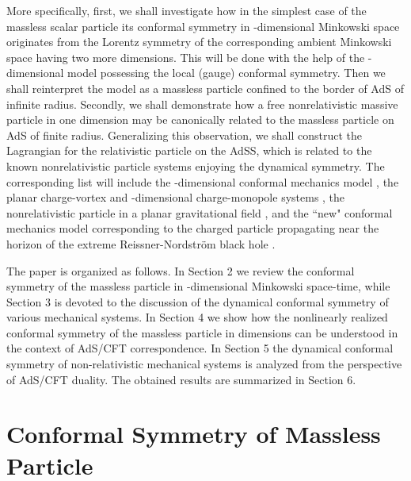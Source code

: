 \documentclass[a4paper,12pt]{article}
\begin{document}
More specifically,
first, we shall investigate how
in the simplest case of the massless scalar particle
its conformal symmetry
in \coordHE{}-dimensional Minkowski space
originates from the Lorentz symmetry
of the corresponding ambient Minkowski space
having two more dimensions.
This will be done with the help of
the \coordHE{}-dimensional model
possessing the local (gauge) \coordHE{} conformal symmetry.
Then we shall reinterpret the model
as a massless particle
confined to the border of AdS\coordHE{}
of infinite radius.
Secondly, we shall demonstrate how a free nonrelativistic
massive particle in one dimension may be canonically related
to the massless particle on AdS\coordHE{}
of finite radius.
Generalizing this observation,
we shall construct
the Lagrangian for the
relativistic particle on the
AdS\coordHE{}S\coordHE{},
which is related to the known
nonrelativistic particle systems
enjoying the dynamical \coordHE{} symmetry.
The corresponding list
will include the \coordHE{}-dimensional conformal mechanics model
\cite{AFF}, the planar charge-vortex and \coordHE{}-dimensional
charge-monopole systems \cite{Jackm,Jackv},
the nonrelativistic particle in a planar
gravitational field \cite{Des},
and the
``new" conformal
mechanics model corresponding to the charged
particle propagating near the horizon of the
extreme Reissner-Nordstr\"om
black hole \cite{kallosh}.

The paper is organized as follows.
In Section 2 we review the conformal symmetry
of the massless particle in \coordHE{}-dimensional Minkowski
space-time, while Section 3 is devoted
to the discussion of the dynamical
conformal \coordHE{}
symmetry of various mechanical
systems.  In Section 4 we show how
the nonlinearly realized conformal symmetry of the massless
particle in \coordHE{} dimensions can be understood
in the context of AdS/CFT correspondence.
In Section 5 the dynamical
conformal symmetry of non-relativistic
mechanical systems is analyzed from the perspective
of AdS/CFT duality.
The obtained results are summarized in Section 6.



\section{\protect\bigskip Conformal Symmetry of Massless
Particle}
\end{document}
